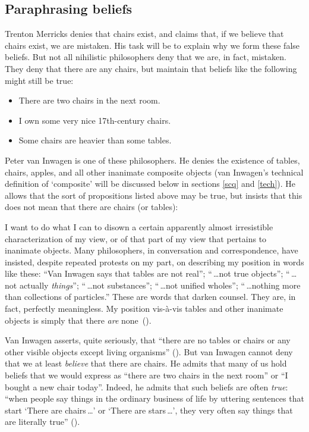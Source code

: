\documentclass[11pt]{article}
\newenvironment{squote}{%
	\begin{spacing}{1}
	\begin{list}{}{%
	\setlength{\labelwidth}{0pt}%
	\rightmargin\leftmargin%
	}
	\item\relax
	}{%
	\end{list}%
	\end{spacing}
	}
\begin{document}
\begin{spacing}{1.5}
\subsection{Paraphrasing beliefs}
\label{paraphrase}
Trenton Merricks denies that chairs exist, and claims that, if we
believe that chairs exist, we are mistaken.  His task will be to
explain why we form these false beliefs.  But not all nihilistic
philosophers deny that we are, in fact, mistaken.  They deny that
there are any chairs, but maintain that beliefs like the following
might still be true:

\begin{itemize}
  \item There are two chairs in the next room.
  \item I own some very nice 17th-century chairs.
  \item Some chairs are heavier than some tables.
\end{itemize}

Peter van Inwagen is one of these philosophers.  He denies the
existence of tables, chairs, apples, and all other inanimate composite
objects (van Inwagen's technical definition of `composite' will be
discussed below in sections \ref{scq} and \ref{tech}).  He allows that
the sort of propositions listed above may be true, but insists that
this does not mean that there are chairs (or tables):
\begin{squote}
I want to do what I can to disown a certain apparently almost
irresistible characterization of my view, or of that part of my view
that pertains to inanimate objects.  Many philosophers, in
conversation and correspondence, have insisted, despite repeated
protests on my part, on describing my position in words like these:
``Van Inwagen says that tables are not real''; ``\,\ldots not true
objects''; ``\,\ldots not actually {\em things}''; ``\,\ldots not
substances''; ``\,\ldots not unified wholes''; ``\,\ldots nothing more
than collections of particles.''  These are words that darken counsel.
They are, in fact, perfectly meaningless.  My position vis-\`{a}-vis
tables and other inanimate objects is simply that there {\em are}
none~(\citeyear[99]{inwagen1995}).
\end{squote}

Van Inwagen asserts, quite seriously, that ``there are no tables or
chairs or any other visible objects except living organisms''
(\citeyear[1]{inwagen1995}).  But van Inwagen cannot deny that we at
least {\em believe} that there are chairs.  He admits that many of us
hold beliefs that we would express as ``there are two chairs in the
next room'' or ``I bought a new chair today''.  Indeed, he admits that
such beliefs are often {\em true}: ``when people say things in the
ordinary business of life by uttering sentences that start `There are
chairs\,\ldots ' or `There are stars\,\ldots ', they very often say
things that are literally true'' (\citeyear[102]{inwagen1995}).


\end{spacing}
\end{document}
